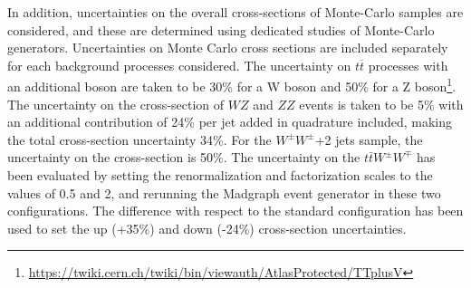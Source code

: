 
In addition, uncertainties on the overall cross-sections of Monte-Carlo samples are considered,
and these are determined using dedicated studies of Monte-Carlo generators.
Uncertainties on Monte Carlo cross sections are included separately for each background processes considered.
The uncertainty on $t \overline{t}$ processes with an additional boson are taken to be 30\% for a W boson 
and 50\% for a Z boson\footnote{\url{https://twiki.cern.ch/twiki/bin/viewauth/AtlasProtected/TTplusV}}.
The uncertainty on the cross-section of $WZ$ and $ZZ$ events is taken to be 5\% with an additional contribution of 24\% per jet added in quadrature included, making the total cross-section uncertainty 34\%.
For the $W^{\pm}W^{\pm}$+2 jets sample, the uncertainty on the cross-section is 50\%.
The uncertainty on the $t\bar{t}W^{\pm}W^{\mp}$ has been evaluated by setting the renormalization
and factorization scales to the values of 0.5 and 2, and rerunning the Madgraph event generator 
in these two configurations. 
The difference with respect to the standard configuration has been used to set the up
(+35\%) and down (-24\%) cross-section uncertainties.



